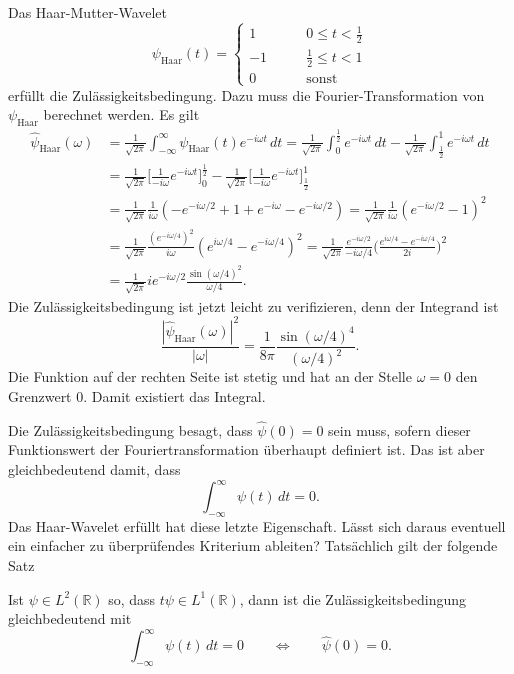 \begin{beispiel}
Das Haar-Mutter-Wavelet
\[
\psi_{\text{Haar}}(t) = \begin{cases}
 1&\qquad 0\le t < \frac12\\
-1&\qquad \frac12 \le t < 1\\
 0&\qquad \text{sonst}
\end{cases}
\]
erfüllt die Zulässigkeitsbedingung.
Dazu muss die Fourier-Transformation von $\psi_{\text{Haar}}$ berechnet
werden.
Es gilt
\begin{align*}
\hat{\psi}_{\text{Haar}}(\omega)
&=
\frac{1}{\sqrt{2\pi}}
\int_{-\infty}^\infty \psi_{\text{Haar}}(t) e^{-i\omega t}\,dt
=
\frac{1}{\sqrt{2\pi}}
\int_0^{\frac12} e^{-i\omega t}\,dt
-
\frac1{\sqrt{2\pi}}
\int_{\frac12}^1e^{-i\omega t}\,dt
\\
&=
\frac1{\sqrt{2\pi}}
\biggl[\frac1{-i\omega}e^{-i\omega t} \biggr]_0^{\frac12}
-
\frac1{\sqrt{2\pi}}
\biggl[\frac1{-i\omega}e^{-i\omega t} \biggr]_{\frac12}^1
\\
&=
\frac{1}{\sqrt{2\pi}}
\frac{1}{i\omega}
(
-e^{-i\omega/2} + 1 + e^{-i\omega} - e^{-i\omega/2}
)
=
\frac{1}{\sqrt{2\pi}}
\frac{1}{i\omega}
( e^{-i\omega/2}-1)^2
\\
&=
\frac{1}{\sqrt{2\pi}}
\frac{(e^{-i\omega/4})^2}{i\omega}
( e^{i\omega/4} - e^{-i\omega/4})^2
=
\frac{1}{\sqrt{2\pi}}
\frac{e^{-i\omega/2}}{-i\omega/4}
\biggl(\frac{e^{i\omega/4}-e^{-i\omega/4}}{2i}\biggr)^2
\\
&=
\frac{1}{\sqrt{2\pi}}
ie^{-i\omega/2}
\frac{\sin(\omega/4)^2}{\omega/4}.
\end{align*}
Die Zulässigkeitsbedingung ist jetzt leicht zu verifizieren, denn
der Integrand ist
\[
\frac{|\hat{\psi}_{\text{Haar}}(\omega)|^2}{|\omega|}
=
\frac{1}{8\pi}\frac{\sin(\omega/4)^4}{(\omega/4)^2}.
\]
Die Funktion auf der rechten Seite ist stetig und hat an der Stelle $\omega=0$
den Grenzwert $0$.
Damit existiert das Integral.
\end{beispiel}


Die Zulässigkeitsbedingung besagt, dass $\hat{\psi}(0)=0$ sein muss,
sofern dieser Funktionswert der Fouriertransformation überhaupt
definiert ist.
Das ist aber gleichbedeutend damit, dass 
\[
\int_{-\infty}^\infty \psi(t)\,dt = 0.
\]
Das Haar-Wavelet erfüllt hat diese letzte Eigenschaft.
Lässt sich daraus eventuell ein einfacher zu überprüfendes Kriterium
ableiten?
Tatsächlich gilt der folgende Satz

\begin{satz}
\label{satz:zulaessigkeit}
Ist $\psi \in L^2(\mathbb R)$ so, dass $t\psi\in L^1(\mathbb R)$, dann
ist die Zulässigkeitsbedingung gleichbedeutend mit
\[
\int_{-\infty}^\infty \psi(t)\,dt = 0
\qquad\Leftrightarrow\qquad
\hat{\psi}(0)=0.
\]
\end{satz}


